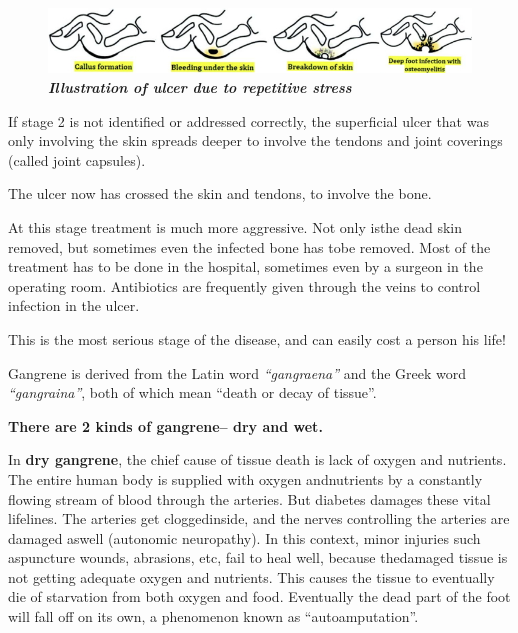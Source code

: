 \begin{figure}[h]
\centering
\includegraphics[scale=2.4]{images/067.jpg}\\
\textbf{\textit{Illustration of ulcer due to repetitive stress}}
\end{figure}


If stage 2 is not identified or addressed correctly, the superficial ulcer that was only involving the skin spreads deeper to involve the tendons and joint coverings (called joint capsules).


The ulcer now has crossed the skin and tendons, to involve the bone.

At this stage treatment is much more aggressive. Not only is\break the dead skin removed, but sometimes even the infected bone has to\break be removed. Most of the treatment has to be done in the hospital, sometimes even by a surgeon in the operating room. Antibiotics are frequently given through the veins to control infection in the ulcer.


This is the most serious stage of the disease, and can easily cost a person his life!

Gangrene is derived from the Latin word \textit{“gangraena”} and the Greek word \textit{“gangraina”}, both of which mean “death or decay of tissue”.

\noindent\textbf{There are 2 kinds of gangrene– dry and wet.}

In \textbf{dry gangrene}, the chief cause of tissue death is lack of oxygen and nutrients. The entire human body is supplied with oxygen and\break nutrients by a constantly flowing stream of blood through the arte\-ries. But diabetes damages these vital lifelines. The arteries get clogged\break inside, and the nerves controlling the arteries are damaged as\break well (auto\-nomic neuropathy). In this context, minor injuries such as\break pun\-cture wounds, abrasions, etc, fail to heal well, because the\break damaged tissue is not getting adequate oxygen and nutrients. This causes the tissue to eve\-ntually die of starvation from both oxygen and food. Eventually the dead part of the foot will fall off on its own, a phenomenon known as “autoamputation”.

